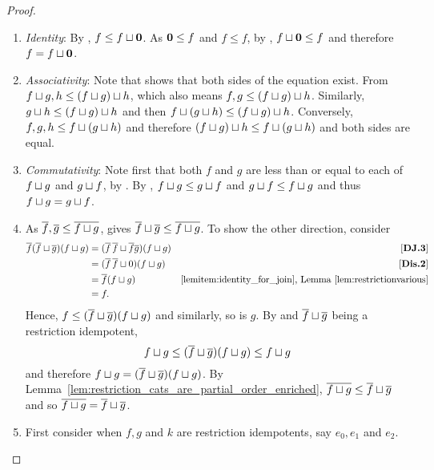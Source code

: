 \begin{proof}
  \prepprooflist
  \begin{enumerate}[{(}i{)}]
    \item \emph{Identity}: By , $f \le f \sqcup \mathbf{0}$. As $\mathbf{0} \le f$ and $f \le
      f$, by , $f \sqcup \mathbf{0} \le f$ and therefore $f = f \sqcup \mathbf{0}$.
    \item \emph{Associativity}: Note that  shows that both sides of the equation
      exist.
      From  $f\sqcup g, h \le (f\sqcup g)\sqcup h$, which also means
      $f, g \le (f\sqcup g)\sqcup h$. Similarly, $g\sqcup h \le (f\sqcup g)\sqcup h $ and then $f
      \sqcup (g\sqcup h)\le (f\sqcup g)\sqcup h$. Conversely, $f,g,h \le f \sqcup (g\sqcup h)$ and
      therefore $(f\sqcup g)\sqcup h \le f \sqcup (g\sqcup h)$ and both sides are equal.
    \item \emph{Commutativity}: Note first that both $f$ and $g$ are less than or equal to each of
      $f\sqcup g$ and $g \sqcup f$, by . By , $f \sqcup g \le
      g\sqcup f$ and $g\sqcup f \le f \sqcup g$ and thus $f \sqcup g = g \sqcup f$.
    \item As $\overline{f}, \overline{g} \le \overline{f\sqcup g}$,  gives
      $\overline{f} \sqcup \overline{g} \le \overline{f \sqcup g}$. To show the other direction, consider
      \begin{align*}
        \overline{f}(\overline{f} \sqcup \overline{g}) (f \sqcup g)
        &= (\overline{f}\,\overline{f} \sqcup \overline{f}\overline{g})(f \sqcup g) &\text{\ensuremath{[\text{\bfseries {DJ}.{3}}]}}\\
        &= (\overline{f}\,\overline{f} \sqcup 0)(f \sqcup g) &\text{\ensuremath{[\text{\bfseries {Dis}.{2}}]}}\\
        &= \overline{f} (f\sqcup g) &\text{\ref{lemitem:identity_for_join}, Lemma~\ref{lem:restrictionvarious}}\\
        &= f.
      \end{align*}
      Hence, $f \le (\overline{f} \sqcup \overline{g}) (f \sqcup g)$ and similarly, so is $g$. By
       and $\overline{f} \sqcup \overline{g}$ being a restriction idempotent,
      \[
        f \sqcup g \le (\overline{f} \sqcup \overline{g}) (f \sqcup g) \le f \sqcup g
      \]
      and therefore $f \sqcup g = (\overline{f} \sqcup \overline{g}) (f \sqcup g)$. By
      Lemma~\ref{lem:restriction_cats_are_partial_order_enriched}, $\overline{f\sqcup g} \le \overline{f}
      \sqcup \overline{g}$ and so $\overline{f\sqcup g} = \overline{f}\sqcup \overline{g}$.
    \item First consider when $f, g$ and $k$ are restriction idempotents, say $e_0, e_1 $ and $e_2$.

\end{enumerate}
\end{proof}
